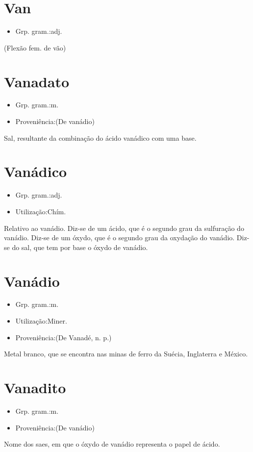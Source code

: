 \documentclass{article}
\begin{document}
\section{Van}
\begin{itemize}
\item {Grp. gram.:adj.}
\end{itemize}
(Flexão fem. de \textunderscore vão\textunderscore )
\section{Vanadato}
\begin{itemize}
\item {Grp. gram.:m.}
\end{itemize}
\begin{itemize}
\item {Proveniência:(De \textunderscore vanádio\textunderscore )}
\end{itemize}
Sal, resultante da combinação do ácido vanádico com uma base.
\section{Vanádico}
\begin{itemize}
\item {Grp. gram.:adj.}
\end{itemize}
\begin{itemize}
\item {Utilização:Chím.}
\end{itemize}
Relativo ao vanádio.
Diz-se de um ácido, que é o segundo grau da sulfuração do vanádio.
Diz-se de um óxydo, que é o segundo grau da oxydação do vanádio.
Diz-se do sal, que tem por base o óxydo de vanádio.
\section{Vanádio}
\begin{itemize}
\item {Grp. gram.:m.}
\end{itemize}
\begin{itemize}
\item {Utilização:Miner.}
\end{itemize}
\begin{itemize}
\item {Proveniência:(De \textunderscore Vanadé\textunderscore , n. p.)}
\end{itemize}
Metal branco, que se encontra nas minas de ferro da Suécia, Inglaterra e México.
\section{Vanadito}
\begin{itemize}
\item {Grp. gram.:m.}
\end{itemize}
\begin{itemize}
\item {Proveniência:(De \textunderscore vanádio\textunderscore )}
\end{itemize}
Nome dos saes, em que o óxydo de vanádio representa o papel de ácido.
\end{document}

